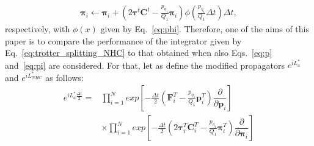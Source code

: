 \documentclass[aip,jcp,reprint,amsmath,amssymb,amsfont]{revtex4-1}
\newcommand{\mt}[1]{\boldsymbol{\mathbf{#1}}}           %
\newcommand{\vt}[1]{\boldsymbol{\mathbf{#1}}}           %
\newcommand{\tr}[1]{#1^t}                               %
\newcommand{\diff}[2]{\dfrac{\partial #1}{\partial #2}} %
\begin{document}
\begin{equation}
\label{eq:pi}
\begin{split}
{\vt \pi}_i \leftarrow {\vt \pi}_i + \left(2 \tr{\vt \tau} \tr{\mt C} - \frac{p_{\eta_1}}{Q_1} {\vt \pi}_i \right) \phi\left(\frac{p_{\eta_1}}{Q_1} \Delta t \right) \Delta t,
\end{split}
\end{equation}
respectively, with $\phi(x)$ given by Eq.~\ref{eq:phi}. Therefore, one of the aims of this paper is to compare the performance of the integrator given by Eq.~\ref{eq:trotter_splitting_NHC} to that obtained when also Eqs.~\ref{eq:p} and~\ref{eq:pi} are considered. For that, let as define the modified propagators $ e^{i L^\ast_a} $ and $ e^{i L^\ast_{NHC}} $ as follows:
\begin{equation}
\begin{split}
e^{iL^\ast_a \frac{\Delta t}{2}} = &\prod_{i=1}^{N} exp\left[-\frac{\Delta t}{2} \left( \vt F_i^T - \frac{p_{\eta_1}}{Q_1}\vt p_i^T \right) \diff{}{\vt p_i} \right] \\
&\times \prod_{i=1}^{N} exp\left[-\frac{\Delta t}{2} \left(2 \vt \tau_i^T \mt C_i^T -  \frac{p_{\eta_1}}{Q_1}\vt \pi_i^T \right)  \diff{}{\vt \pi_i}   \right]
\end{split}
\end{equation}
\end{document}
